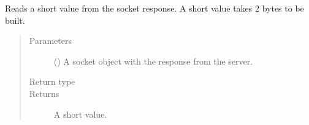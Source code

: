 \documentclass[letterpaper,10pt,english]{sphinxmanual}
\begin{document}

\begin{fulllineitems}
\label{\detokenize{index:secondodb.api.support.secondoinputhandler.read_short}}
Reads a short value from the socket response. A short value takes 2 bytes to be built.
\begin{quote}\begin{description}
\item[{Parameters}] \leavevmode
{} () \textendash{} A socket object with the response from the  server.

\item[{Return type}] \leavevmode
{}

\item[{Returns}] \leavevmode
A short value.

\end{description}\end{quote}

\end{fulllineitems}

\end{document}
